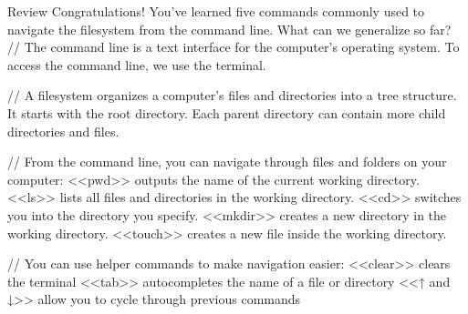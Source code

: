 Review
    Congratulations! You’ve learned five commands commonly used to navigate the filesystem from the command line. What can we generalize so far?
        // The command line is a text interface for the computer’s operating system. To access the command line, we use the terminal.
    
        // A filesystem organizes a computer’s files and directories into a tree structure. It starts with the root directory. Each parent directory can contain more child directories and files.
    
        // From the command line, you can navigate through files and folders on your computer:
            <<pwd>> outputs the name of the current working directory.
            <<ls>> lists all files and directories in the working directory.
            <<cd>> switches you into the directory you specify.
            <<mkdir>> creates a new directory in the working directory.
            <<touch>> creates a new file inside the working directory.
    
        // You can use helper commands to make navigation easier:
            <<clear>> clears the terminal
            <<tab>> autocompletes the name of a file or directory
            <<↑ and ↓>> allow you to cycle through previous commands